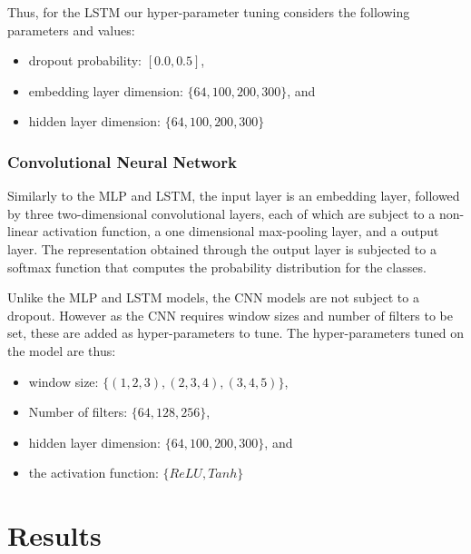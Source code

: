 Thus, for the LSTM our hyper-parameter tuning considers the following parameters and values:

\begin{itemize}
  \item dropout probability: $[0.0, 0.5]$,
  \item embedding layer dimension: $\{64, 100, 200, 300\}$, and
  \item hidden layer dimension: $\{64, 100, 200, 300\}$
\end{itemize}

\subsubsection{Convolutional Neural Network}
Similarly to the MLP and LSTM, the input layer is an embedding layer, followed by three two-dimensional convolutional layers, each of which are subject to a non-linear activation function, a one dimensional max-pooling layer, and a output layer. 
The representation obtained through the output layer is subjected to a softmax function that computes the probability distribution for the classes.


Unlike the MLP and LSTM models, the CNN models are not subject to a dropout.
However as the CNN requires window sizes and number of filters to be set, these are added as hyper-parameters to tune. The hyper-parameters tuned on the model are thus:

\begin{itemize}
  \item window size: $\{(1, 2, 3), (2, 3, 4), (3, 4, 5)\}$,
  \item Number of filters: $\{64, 128, 256\}$,
  \item hidden layer dimension: $\{64, 100, 200, 300\}$, and
  \item the activation function: $\{ReLU, Tanh\}$
\end{itemize}

\section{Results}

